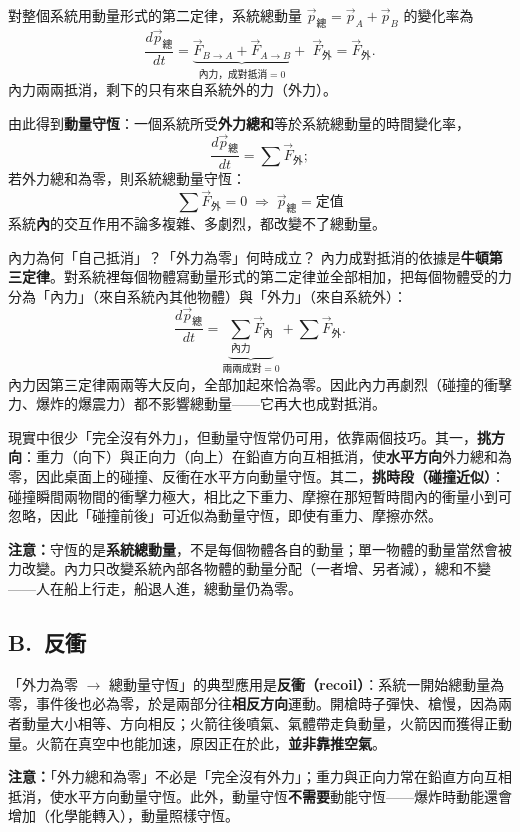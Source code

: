 \documentclass[11pt]{article}
\begin{document}
對整個系統用動量形式的第二定律，系統總動量 $\vec p_{\text{總}}=\vec p_A+\vec p_B$ 的變化率為
$$\frac{d\vec p_{\text{總}}}{dt}=\underbrace{\vec F_{B\to A}+\vec F_{A\to B}}_{\text{內力，成對抵消}=0}+\;\vec F_{\text{外}}=\vec F_{\text{外}}.$$
內力兩兩抵消，剩下的只有來自系統外的力（外力）。

由此得到\textbf{動量守恆}：一個系統所受\textbf{外力總和}等於系統總動量的時間變化率，
$$\frac{d\vec p_{\text{總}}}{dt}=\sum\vec F_{\text{外}};$$
若外力總和為零，則系統總動量守恆：
$$\boxed{\,\sum\vec F_{\text{外}}=0 \;\Longrightarrow\; \vec p_{\text{總}}=\text{定值}\,}$$
系統\textbf{內}的交互作用不論多複雜、多劇烈，都改變不了總動量。

\begin{補充框}{內力為何「自己抵消」？「外力為零」何時成立？}
內力成對抵消的依據是\textbf{牛頓第三定律}。對系統裡每個物體寫動量形式的第二定律並全部相加，把每個物體受的力分為「內力」（來自系統內其他物體）與「外力」（來自系統外）：
$$\frac{d\vec p_{\text{總}}}{dt}=\underbrace{\sum_{\text{內力}}\vec F_{\text{內}}}_{\text{兩兩成對}=0}+\sum\vec F_{\text{外}}.$$
內力因第三定律兩兩等大反向，全部加起來恰為零。因此內力再劇烈（碰撞的衝擊力、爆炸的爆震力）都不影響總動量——它再大也成對抵消。

現實中很少「完全沒有外力」，但動量守恆常仍可用，依靠兩個技巧。其一，\textbf{挑方向}：重力（向下）與正向力（向上）在鉛直方向互相抵消，使\textbf{水平方向}外力總和為零，因此桌面上的碰撞、反衝在水平方向動量守恆。其二，\textbf{挑時段（碰撞近似）}：碰撞瞬間兩物間的衝擊力極大，相比之下重力、摩擦在那短暫時間內的衝量小到可忽略，因此「碰撞前後」可近似為動量守恆，即使有重力、摩擦亦然。

\textbf{注意：}守恆的是\textbf{系統總動量}，不是每個物體各自的動量；單一物體的動量當然會被力改變。內力只改變系統內部各物體的動量分配（一者增、另者減），總和不變——人在船上行走，船退人進，總動量仍為零。
\end{補充框}

\subsection*{\sffamily B.\ 反衝}

「外力為零 $\rightarrow$ 總動量守恆」的典型應用是\textbf{反衝（recoil）}：系統一開始總動量為零，事件後也必為零，於是兩部分往\textbf{相反方向}運動。開槍時子彈快、槍慢，因為兩者動量大小相等、方向相反；火箭往後噴氣、氣體帶走負動量，火箭因而獲得正動量。火箭在真空中也能加速，原因正在於此，\textbf{並非靠推空氣}。

\textbf{注意：}「外力總和為零」不必是「完全沒有外力」；重力與正向力常在鉛直方向互相抵消，使水平方向動量守恆。此外，動量守恆\textbf{不需要}動能守恆——爆炸時動能還會增加（化學能轉入），動量照樣守恆。
\end{document}
